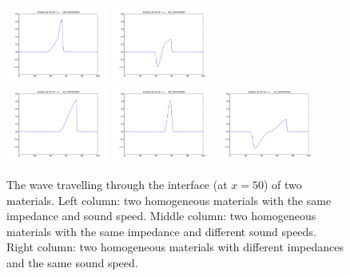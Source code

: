 \documentclass{article}
\begin{document}
\begin{figure}
  \includegraphics[width=0.3\textwidth]{sound3.png}
  \includegraphics[width=0.3\textwidth]{reflect3.png}\\
    \includegraphics[width=0.3\textwidth]{homo4.png}
  \includegraphics[width=0.3\textwidth]{sound4.png}
  \includegraphics[width=0.3\textwidth]{reflect4.png}
  \caption{The wave travelling through the interface (at $x=50$) of two materials. Left column: two homogeneous materials with the same impedance and sound speed. Middle column: two homogeneous materials with the same impedance and different sound speeds. Right column: two homogeneous materials with different impedances and the same sound speed.}
  \label{imp}
\end{figure}
\end{document}
